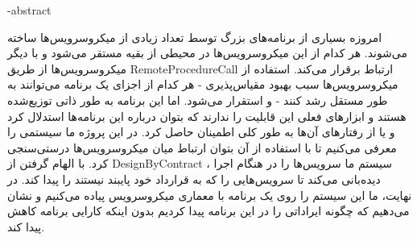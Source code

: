 \fa-abstract{
امروزه بسیاری از برنامه‌های بزرگ توسط تعداد زیادی از میکروسرویس‌ها ساخته می‌شوند. هر کدام از این میکروسرویس‌ها در محیطی از بقیه مستقر می‌شود و با دیگر میکروسرویس‌ها از طریق
\gls{RemoteProcedureCall}
ارتباط برقرار می‌کند. استفاده از میکروسرویس‌ها سبب بهبود مقیاس‌پذیری - هر کدام از اجزای یک برنامه می‌توانند به طور مستقل رشد کنند - و استقرار می‌شود. اما این برنامه‌ به طور ذاتی توزیع‌شده هستند و ابزارهای فعلی این قابلیت را ندارند که بتوان درباره این برنامه‌ها استدلال کرد و یا از رفتارهای آن‌ها به طور کلی اطمینان حاصل کرد.
در این پروژه ما سیستمی را معرفی می‌کنیم تا با استفاده از آن بتوان ارتباط میان میکروسرویس‌ها درستی‌سنجی کرد. با الهام گرفتن از
\gls{DesignByContract}
، سیستم ما سرویس‌ها را در هنگام اجرا دیده‌بانی می‌کند تا سرویس‌هایی را که به قرارداد خود پایبند نیستند را پیدا کند. در نهایت، ما این سیستم را روی یک برنامه با معماری میکروسرویس پیاده می‌کنیم و نشان می‌دهیم که چگونه ایراداتی را در این برنامه پیدا کردیم بدون اینکه کارایی برنامه کاهش پیدا کند.

}
